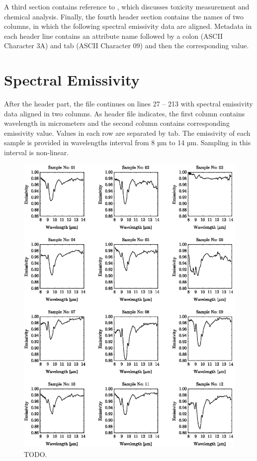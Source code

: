 A third section contains reference to \cite{FK05}, which discusses toxicity measurement and chemical analysis. Finally, the fourth header section contains the names of two columns, in which the following spectral emissivity data are aligned. Metadata in each header line contains an attribute name followed by a colon (ASCII Character 3A) and tab (ASCII Character 09) and then the corresponding value.

\section{Spectral Emissivity}

After the header part, the file continues on lines 27 – 213 with spectral emissivity data aligned in two columns. As header file indicates, the first column contains wavelength in micrometers and the second column contains corresponding emissivity value. Values in each row are separated by tab. The emissivity of each sample is provided in wavelengths interval from 8 µm to 14 µm. Sampling in this interval is non-linear.

\begin{figure}[!t]
\centering
\includegraphics[width=0.95\linewidth]{pics/Chapter_05/spectral_library_pt1.eps}
\vspace{1.5 em}
\caption{TODO.}
\label{fig:SpoilSubstratesPreviewPt1}
\end{figure}


